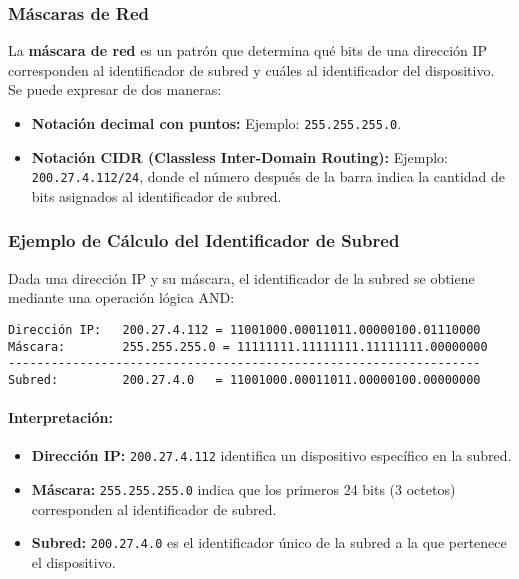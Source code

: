 \documentclass[a4paper,12pt]{article}
\begin{document}
\subsubsection*{Máscaras de Red}

La \textbf{máscara de red} es un patrón que determina qué bits de una dirección IP corresponden al identificador de subred y cuáles al identificador del dispositivo. Se puede expresar de dos maneras:
\begin{itemize}
    \item \textbf{Notación decimal con puntos:} Ejemplo: \texttt{255.255.255.0}.
    \item \textbf{Notación CIDR (Classless Inter-Domain Routing):} Ejemplo: \texttt{200.27.4.112/24}, donde el número después de la barra indica la cantidad de bits asignados al identificador de subred.
\end{itemize}

\subsubsection*{Ejemplo de Cálculo del Identificador de Subred}

Dada una dirección IP y su máscara, el identificador de la subred se obtiene mediante una operación lógica AND:

\begin{verbatim}
Dirección IP:   200.27.4.112 = 11001000.00011011.00000100.01110000
Máscara:        255.255.255.0 = 11111111.11111111.11111111.00000000
------------------------------------------------------------------
Subred:         200.27.4.0   = 11001000.00011011.00000100.00000000
\end{verbatim}

\paragraph{Interpretación:}
\begin{itemize}
    \item \textbf{Dirección IP:} \texttt{200.27.4.112} identifica un dispositivo específico en la subred.
    \item \textbf{Máscara:} \texttt{255.255.255.0} indica que los primeros 24 bits (3 octetos) corresponden al identificador de subred.
    \item \textbf{Subred:} \texttt{200.27.4.0} es el identificador único de la subred a la que pertenece el dispositivo.
\end{itemize}
\end{document}
